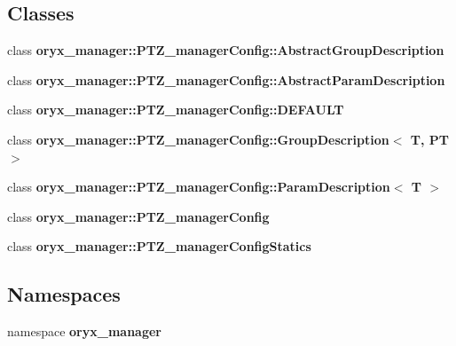 \subsection*{\-Classes}
\begin{DoxyCompactItemize}
\item 
class {\bf oryx\-\_\-manager\-::\-P\-T\-Z\-\_\-manager\-Config\-::\-Abstract\-Group\-Description}
\item 
class {\bf oryx\-\_\-manager\-::\-P\-T\-Z\-\_\-manager\-Config\-::\-Abstract\-Param\-Description}
\item 
class {\bf oryx\-\_\-manager\-::\-P\-T\-Z\-\_\-manager\-Config\-::\-D\-E\-F\-A\-U\-L\-T}
\item 
class {\bf oryx\-\_\-manager\-::\-P\-T\-Z\-\_\-manager\-Config\-::\-Group\-Description$<$ T, P\-T $>$}
\item 
class {\bf oryx\-\_\-manager\-::\-P\-T\-Z\-\_\-manager\-Config\-::\-Param\-Description$<$ T $>$}
\item 
class {\bf oryx\-\_\-manager\-::\-P\-T\-Z\-\_\-manager\-Config}
\item 
class {\bf oryx\-\_\-manager\-::\-P\-T\-Z\-\_\-manager\-Config\-Statics}
\end{DoxyCompactItemize}
\subsection*{\-Namespaces}
\begin{DoxyCompactItemize}
\item 
namespace {\bf oryx\-\_\-manager}
\end{DoxyCompactItemize}
